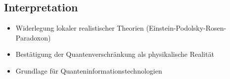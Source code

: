 \subsection{Interpretation}
\begin{itemize}
\item Widerlegung lokaler realistischer Theorien (Einstein-Podolsky-Rosen-Paradoxon)
\item Bestätigung der Quantenverschränkung als physikalische Realität
\item Grundlage für Quanteninformationstechnologien
\end{itemize}
